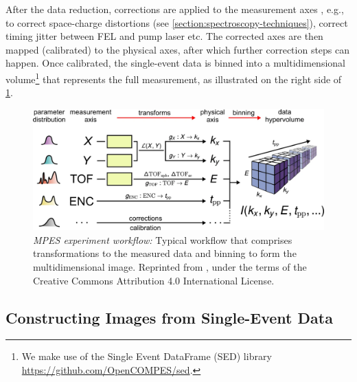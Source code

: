 After the data reduction, corrections are applied to the measurement axes , e.g., to correct space-charge distortions (see \cref{section:spectroscopy-techniques}), correct timing jitter between \gls{FEL} and pump laser etc. The corrected axes are then mapped (calibrated) to the physical axes, after which further correction steps can happen. Once calibrated, the single-event data is binned into a multidimensional volume\footnote{We make use of the Single Event DataFrame (SED) library \href{https://github.com/OpenCOMPES/sed}{https://github.com/OpenCOMPES/sed}.} that represents the full measurement, as illustrated on the right side of \cref{fig:mpes_workflow}.

\begin{figure}
    \centering
    \includegraphics[width=1\linewidth]{images/41597_2020_769_Fig2_HTML.png}
    \caption{\textit{MPES experiment workflow:} Typical workflow that comprises transformations to the measured data and binning to form the multidimensional image. Reprinted from \cite{xianOpensourceEndtoendWorkflow2020}, under the terms of the Creative Commons Attribution 4.0 International License.}
    \label{fig:mpes_workflow}
\end{figure}

\subsection{Constructing Images from Single-Event Data}

